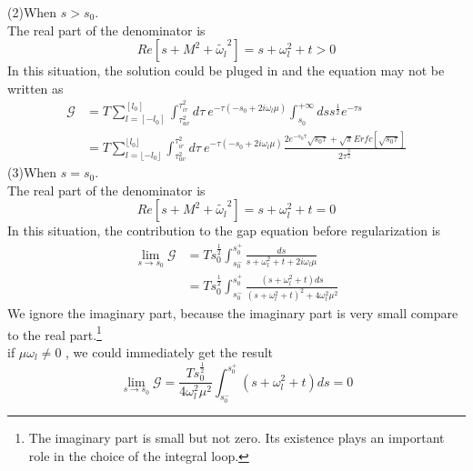 \documentclass{article}
\begin{document}
(2)\quad When $s>s_0$. \\
The real part of the denominator is
\begin{equation}
    Re\left[s+M^2+\widetilde{\omega_l}^2\right]=s+\omega_l^2+t>0 
\end{equation}
In this situation, the solution could be pluged in and the equation may not be written as
\begin{equation}
    \begin{split}
        \mathcal{G} &=T \sum_{l=\left[-l_0\right]}^{\left[l_0\right]}  \int_{\tau_{uv}^2}^{\tau_{ir}^2}d\tau\ e^{-\tau \left(-s_0+2i\omega_l\mu\right)}  \int_{s_0}^{+\infty}ds  s^{\frac{1}{2}}e^{-\tau s}\\
        &=T \sum_{l=\lfloor -l_0\rfloor }^{\lfloor l_0\rfloor }\int_{\tau_{uv}^2}^{\tau_{ir}^2}d\tau\ e^{-\tau \left(-s_0+2i\omega_l\mu\right)}\frac{2e^{-s_0\tau}\sqrt{s_0\tau}+\sqrt{\pi}Erfc\left[\sqrt{s_0\tau}\right]}{2\tau^{\frac{3}{2}}} 
    \end{split}
\end{equation}
\newpage$ $\\
(3)\quad When $s=s_0$. \\
The real part of the denominator is
\begin{equation}
    Re\left[s+M^2+\widetilde{\omega_l}^2\right]=s+\omega_l^2+t=0 
\end{equation}
In this situation, the contribution to the gap equation before regularization is
\begin{equation}\label{real}
    \begin{split}
        \lim_{s\rightarrow s_0}\mathcal{G} 
        &=T s_0^{\frac{1}{2}}\int_{s_0^-}^{s_0^+}\frac{ds}{s+\omega_l^2+t+2i\omega_l\mu}\\
        &=T s_0^{\frac{1}{2}}\int_{s_0^-}^{s_0^+}\frac{\left(s+\omega_l^2+t\right)ds}{\left(s+\omega_l^2+t\right)^2+4\omega_l^2\mu^2}
    \end{split}
\end{equation}
We ignore the imaginary part, because the imaginary part is very small compare to the real part.\footnote{The imaginary part is small but not zero. Its existence plays an important role in the choice of the integral loop.}\\
if $\mu \omega_l\neq0$ , we could immediately get the result
\begin{equation}
    \lim_{s\rightarrow s_0}\mathcal{G} 
    =\frac{T s_0^{\frac{1}{2}}}{4\omega_l^2\mu^2}\int_{s_0^-}^{s_0^+}\left(s+\omega_l^2+t\right)ds
    =0 
\end{equation} 
\end{document}
